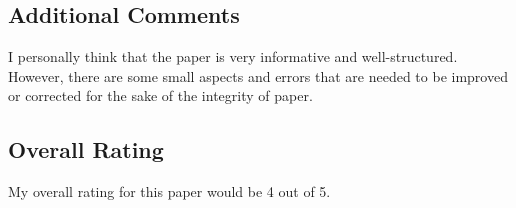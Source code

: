 \documentclass[ieeetran]{article}
\begin{document}
\subsection*{Additional Comments} %
\label{sub:additional_comments}
I personally think that the paper is very informative and well-structured. However, there are some small aspects and errors that are needed to be improved or corrected for the sake of the integrity of paper.

\subsection*{Overall Rating} %
\label{sub:overall_rating}
My overall rating for this paper would be 4 out of 5.
\end{document}
